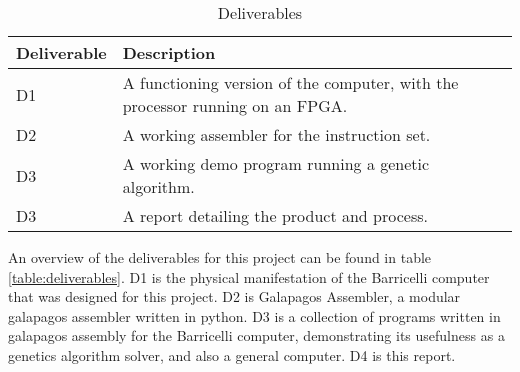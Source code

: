 \begin{table}[h]
 \begin{center}
 \begin{tabular}{| l | l |}
 \hline
 Deliverable & Description \\
 \hline
 D1 & A functioning version of the computer, with the processor running on an FPGA.\\
 D2 & A working assembler for the instruction set.\\
 D3 & A working demo program running a genetic algorithm.\\
 D3 & A report detailing the product and process.\\
 \hline
 \end{tabular}
 \caption{Deliverables}
 \label{table:deliverables}
 \end{center}
 \end{table}

An overview of the deliverables for this project can be found in table \vref{table:deliverables}.
D1 is the physical manifestation of the Barricelli computer that was designed for this project.
D2 is Galapagos Assembler, a modular galapagos assembler written in python.
D3 is a collection of programs written in galapagos assembly for the Barricelli computer, demonstrating its usefulness as a genetics algorithm solver, and also a general computer.
D4 is this report.
